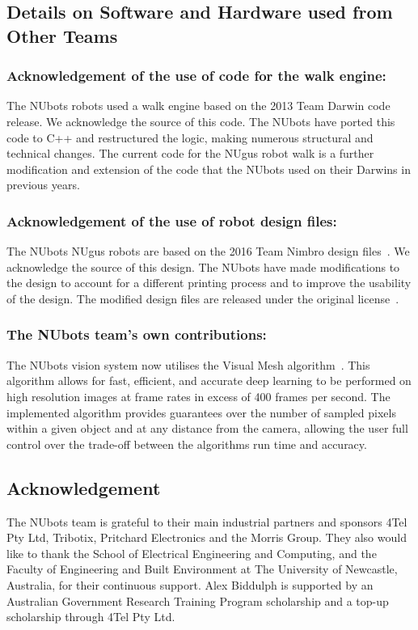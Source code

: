 \documentclass{llncs}
\begin{document}
\subsection{Details on Software and Hardware used from Other Teams}

\subsubsection{Acknowledgement of the use of code for the walk engine:}
The NUbots robots used a walk engine based on the 2013 Team Darwin code release. We acknowledge the source of this code. The NUbots have ported this code to C++ and restructured the logic, making numerous structural and technical changes. The current code for the NUgus robot walk is a further modification and extension of the code that the NUbots used on their Darwins in previous years.

\subsubsection{Acknowledgement of the use of robot design files:}
The NUbots NUgus robots are based on the 2016 Team Nimbro design files~\cite{igusDesignFiles}. We acknowledge the source of this design. The NUbots have made modifications to the design to account for a different printing process and to improve the usability of the design. The modified design files are released under the original license~\cite{nubotsHardwareGit}.

\subsubsection{The NUbots team’s own contributions:}
The NUbots vision system now utilises the Visual Mesh algorithm~\cite{Houliston2018VisualMR}. This algorithm allows for fast, efficient, and accurate deep learning to be performed on high resolution images at frame rates in excess of 400 frames per second. The implemented algorithm provides guarantees over the number of sampled pixels within a given object and at any distance from the camera, allowing the user full control over the trade-off between the algorithms run time and accuracy.

\subsection*{Acknowledgement} The NUbots team is grateful to their main industrial partners and sponsors 4Tel Pty Ltd, Tribotix, Pritchard Electronics and the Morris Group. They also would like to thank the School of Electrical Engineering and Computing, and the Faculty of Engineering and Built Environment at The University of Newcastle, Australia, for their continuous support. Alex Biddulph is supported by an Australian Government Research Training Program scholarship and a top-up scholarship through 4Tel Pty Ltd.




\end{document}
